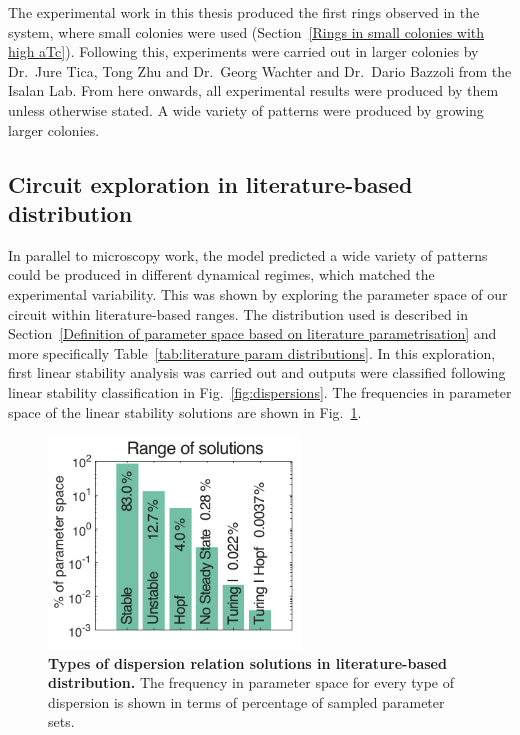 The experimental work in this thesis produced the first rings observed in the system, where small colonies were used (Section~\ref{Rings in small colonies with high aTc}).
Following this, experiments were carried out in larger colonies by Dr.~Jure Tica, Tong Zhu and Dr.~Georg Wachter and Dr.~Dario Bazzoli from the Isalan Lab.
From here onwards, all experimental results were produced by them unless otherwise stated.
A wide variety of patterns were produced by growing larger colonies.


\subsection{Circuit exploration in literature-based distribution}
In parallel to microscopy work, the model predicted a wide variety of patterns could be produced in different dynamical regimes, which matched the experimental variability.
This was shown by exploring the parameter space of our circuit within literature-based ranges.
The distribution used is described in Section~\ref{Definition of parameter space based on literature parametrisation} and more specifically Table~\ref{tab:literature param distributions}.
In this exploration, first linear stability analysis was carried out and outputs were classified following linear stability classification in Fig.~\ref{fig:dispersions}.
The frequencies in parameter space of the linear stability solutions are shown in Fig.~\ref{system_class_frequencies}.
\begin{figure}[H]
    \centering

    \includegraphics[width=0.6\textwidth]{chapters/Chapter 3/system_class_frequencies}
    \caption{\textbf{Types of dispersion relation solutions in literature-based distribution.} The frequency in parameter space for every type of dispersion is shown in terms of percentage of sampled parameter sets.}
    \label{system_class_frequencies}
\end{figure}


